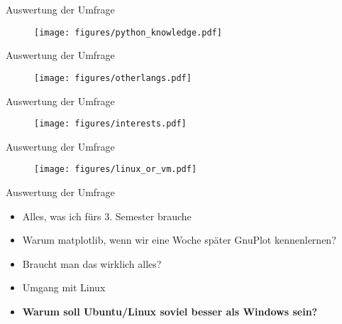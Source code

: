 \begin{frame}{Auswertung der Umfrage}
    \begin{figure}
        \centering
        \texttt{[image: figures/python\_knowledge.pdf]}
    \end{figure}
\end{frame}
\begin{frame}{Auswertung der Umfrage}
    \begin{figure}
        \centering
        \texttt{[image: figures/otherlangs.pdf]}
    \end{figure}
\end{frame}
\begin{frame}{Auswertung der Umfrage}
    \begin{figure}
        \centering
        \texttt{[image: figures/interests.pdf]}
    \end{figure}
\end{frame}
\begin{frame}{Auswertung der Umfrage}
    \begin{figure}
        \centering
        \texttt{[image: figures/linux\_or\_vm.pdf]}
    \end{figure}
\end{frame}
\begin{frame}{Auswertung der Umfrage}
    \begin{itemize}
        \item Alles, was ich fürs 3. Semester brauche
        \item Warum matplotlib, wenn wir eine Woche später GnuPlot kennenlernen?
        \item Braucht man das wirklich alles?
        \item Umgang mit Linux
        \item \textbf{Warum soll Ubuntu/Linux soviel besser als Windows sein?}
    \end{itemize}
\end{frame}
